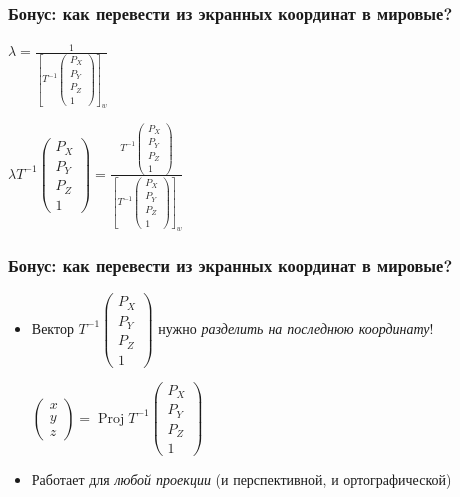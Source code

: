 \documentclass[10pt]{beamer}
\begin{document}
\begin{frame}[fragile]
\frametitle{Бонус: как перевести из экранных координат в мировые?}
\begin{center}
\begin{math}
\lambda =
\frac{1}{
\left[
T^{-1} \begin{pmatrix}P_X \\ P_Y \\ P_Z \\ 1\end{pmatrix}
\right]_w}
\end{math}
\end{center}
\pause
\begin{center}
\begin{math}
\lambda T^{-1} \begin{pmatrix}P_X \\ P_Y \\ P_Z \\ 1\end{pmatrix} = \frac{T^{-1} \begin{pmatrix}P_X \\ P_Y \\ P_Z \\ 1\end{pmatrix}}{\left[
T^{-1} \begin{pmatrix}P_X \\ P_Y \\ P_Z \\ 1\end{pmatrix}
\right]_w}
\end{math}
\end{center}
\end{frame}

\begin{frame}[fragile]
\frametitle{Бонус: как перевести из экранных координат в мировые?}
\begin{itemize}
\item Вектор \begin{math}T^{-1}\begin{pmatrix}P_X \\ P_Y \\ P_Z \\ 1\end{pmatrix}\end{math} нужно \textit{разделить на последнюю координату}!
\pause
\begin{center}
\begin{math}
\begin{pmatrix}x \\ y \\ z\end{pmatrix} =
\operatorname{Proj} T^{-1} \begin{pmatrix}P_X \\ P_Y \\ P_Z \\ 1\end{pmatrix}
\end{math}
\end{center}
\pause
\item Работает для \textit{любой проекции} (и перспективной, и ортографической)
\end{itemize}
\end{frame}
\end{document}
